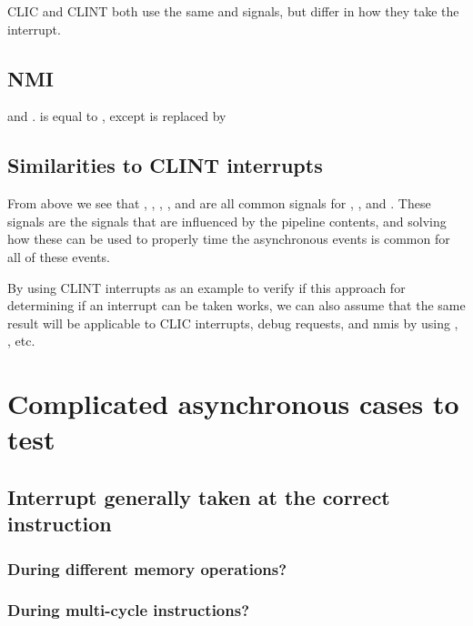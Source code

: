 CLIC and CLINT both use the same  and  signals, but differ in how they take the interrupt.

\subsection{NMI}

 and .
 is equal to , except  is replaced by 


\subsection{Similarities to CLINT interrupts}

From above we see that , , , , and  are all common signals for , , and . These signals are the signals that are influenced by the pipeline contents, and solving how these can be used to properly time the asynchronous events is common for all of these events.


By using CLINT interrupts as an example to verify if this approach for determining if an interrupt can be taken works, we can also assume that the same result will be applicable to CLIC interrupts, debug requests, and \acrshort{nmi}s by using , , etc. 




\section{Complicated asynchronous cases to test}

\subsection{Interrupt generally taken at the correct instruction}
\subsubsection{During different memory operations?}
\subsubsection{During multi-cycle instructions?}
